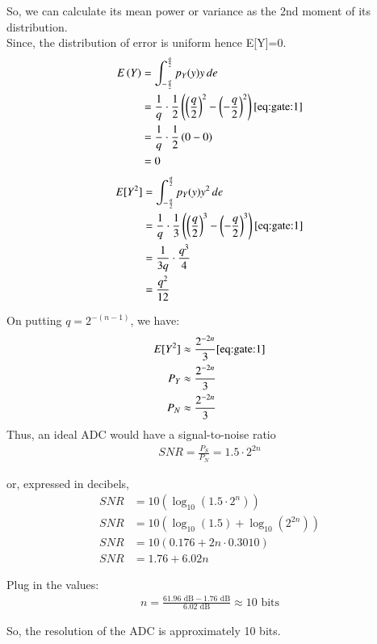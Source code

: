 \documentclass[journal,12pt,onecolumn]{IEEEtran}
\begin{document}
So, we can calculate its mean power or variance as the 2nd moment of its distribution.\\
Since, the distribution of error is uniform hence E[Y]=0.\\
\begin{align}
E\left(Y\right) &= \int_{-\frac{q}{2}}^{\frac{q}{2}} p_Y(y) y \, de \\
&= \frac{1}{q} \cdot \frac{1}{2} \left(\left(\frac{q}{2}\right)^{2} - \left(-\frac{q}{2}\right)^{2}\right) \ref{eq:gate:1} \\
&= \frac{1}{q} \cdot \frac{1}{2} \left(0 - 0\right)\\
&= 0
\end{align}
\begin{align} 
E[Y^{2}] &= \int_{-\frac{q}{2}}^{\frac{q}{2}} p_Y(y) y^{2} \, de \\
&= \frac{1}{q} \cdot \frac{1}{3} \left(\left(\frac{q}{2}\right)^{3} - \left(-\frac{q}{2}\right)^{3}\right)  \ref{eq:gate:1} \\
&=\frac{1}{3q} \cdot \frac{q^{3}}{4}\\
&=\frac{q^{2}}{12}\\
\end{align}

On putting \(q = 2^{-(n-1)}\), we have:
\begin{align}
E[Y^{2}] &\approx \frac{2^{-2n}}{3} \ref{eq:gate:1} \\
P_Y &\approx \frac{2^{-2n}}{3}\\
P_N &\approx \frac{2^{-2n}}{3}\\
\end{align}
Thus, an ideal ADC would have a signal-to-noise ratio
\begin{align}
SNR = \frac{P_S}{P_N} = 1.5 \cdot 2^{2n}
\end{align}

or, expressed in decibels,
\begin{align}
SNR &= 10 \left(\log_{10}(1.5 \cdot 2^{n})\right)\\
SNR &= 10 \left(\log_{10}(1.5) + \log_{10}(2^{2n})\right)\\
SNR &= 10 \left(0.176 + 2n \cdot 0.3010\right)\\
SNR &= 1.76 + 6.02n
\end{align}

Plug in the values:
\begin{align}
n = \frac{61.96 \text{ dB} - 1.76 \text{ dB}}{6.02 \text{ dB}} \approx 10 \text{ bits}
\end{align}

So, the resolution of the ADC is approximately 10 bits.\\
\end{document}
